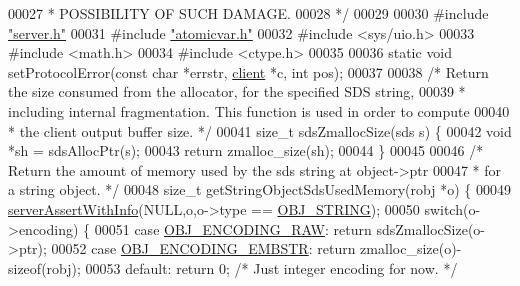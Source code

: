 \begin{DoxyCode}
00027 \textcolor{comment}{ * POSSIBILITY OF SUCH DAMAGE.}
00028 \textcolor{comment}{ */}
00029 
00030 \textcolor{preprocessor}{#}\textcolor{preprocessor}{include} \hyperlink{server_8h}{"server.h"}
00031 \textcolor{preprocessor}{#}\textcolor{preprocessor}{include} \hyperlink{atomicvar_8h}{"atomicvar.h"}
00032 \textcolor{preprocessor}{#}\textcolor{preprocessor}{include} \textcolor{preprocessor}{<}\textcolor{preprocessor}{sys}\textcolor{preprocessor}{/}\textcolor{preprocessor}{uio}\textcolor{preprocessor}{.}\textcolor{preprocessor}{h}\textcolor{preprocessor}{>}
00033 \textcolor{preprocessor}{#}\textcolor{preprocessor}{include} \textcolor{preprocessor}{<}\textcolor{preprocessor}{math}\textcolor{preprocessor}{.}\textcolor{preprocessor}{h}\textcolor{preprocessor}{>}
00034 \textcolor{preprocessor}{#}\textcolor{preprocessor}{include} \textcolor{preprocessor}{<}\textcolor{preprocessor}{ctype}\textcolor{preprocessor}{.}\textcolor{preprocessor}{h}\textcolor{preprocessor}{>}
00035 
00036 \textcolor{keyword}{static} \textcolor{keywordtype}{void} setProtocolError(\textcolor{keyword}{const} \textcolor{keywordtype}{char} *errstr, \hyperlink{structclient}{client} *c, \textcolor{keywordtype}{int} pos);
00037 
00038 \textcolor{comment}{/* Return the size consumed from the allocator, for the specified SDS string,}
00039 \textcolor{comment}{ * including internal fragmentation. This function is used in order to compute}
00040 \textcolor{comment}{ * the client output buffer size. */}
00041 size\_t sdsZmallocSize(sds s) \{
00042     \textcolor{keywordtype}{void} *sh = sdsAllocPtr(s);
00043     \textcolor{keywordflow}{return} zmalloc\_size(sh);
00044 \}
00045 
00046 \textcolor{comment}{/* Return the amount of memory used by the sds string at object->ptr}
00047 \textcolor{comment}{ * for a string object. */}
00048 size\_t getStringObjectSdsUsedMemory(robj *o) \{
00049     \hyperlink{server_8h_a7308f76cbff9a8d3797fe78190b91282}{serverAssertWithInfo}(NULL,o,o->type == \hyperlink{server_8h_a65236ea160f69cdef33ec942092af88f}{OBJ\_STRING});
00050     \textcolor{keywordflow}{switch}(o->encoding) \{
00051     \textcolor{keywordflow}{case} \hyperlink{server_8h_a148bc85e3074e324a6dc5eebcad1bcd5}{OBJ\_ENCODING\_RAW}: \textcolor{keywordflow}{return} sdsZmallocSize(o->ptr);
00052     \textcolor{keywordflow}{case} \hyperlink{server_8h_ac5bb76b546161fd0da4b0ff89b3142ee}{OBJ\_ENCODING\_EMBSTR}: \textcolor{keywordflow}{return} zmalloc\_size(o)-\textcolor{keyword}{sizeof}(robj);
00053     \textcolor{keywordflow}{default}: \textcolor{keywordflow}{return} 0; \textcolor{comment}{/* Just integer encoding for now. */}

\end{DoxyCode}
